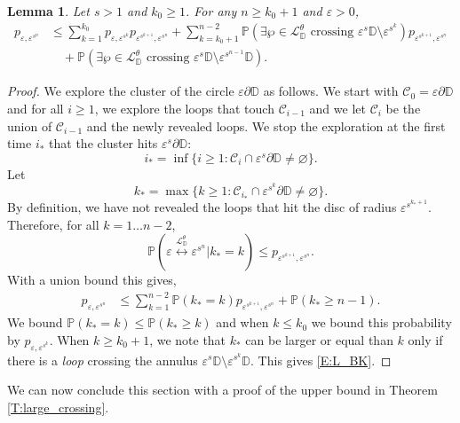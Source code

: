 \documentclass[11pt]{article}
\newtheorem{lemma}[theorem]{Lemma}
\theoremstyle{remark}
\newcommand{\D}{\mathbb{D}}
\newcommand{\Cc}{\mathcal{C}}
\newcommand{\Lc}{\mathcal{L}}
\newcommand{\Prob}[1]{\mathbb{P} \left( #1 \right) }
\newcommand{\eps}{\varepsilon}
\numberwithin{equation}{section}
\begin{document}
\begin{lemma}\label{L:BK_inequality}
Let $s>1$ and $k_0 \geq 1$. For any $n \geq k_0+1$ and $\eps >0$,
\begin{align}
\label{E:L_BK}
p_{\eps, \eps^{s^n}} & \leq \sum_{k=1}^{k_0} p_{\eps,\eps^{s^k}} p_{\eps^{s^{k+1}},\eps^{s^n}} + \sum_{k=k_0+1}^{n-2} \Prob{ \exists \wp \in \Lc_\D^\theta \text{~crossing~} \eps^s \D \setminus \eps^{s^k} } p_{\eps^{s^{k+1}}, \eps^{s^n}} \\
& \quad + \Prob{ \exists \wp \in \Lc_\D^\theta \text{~crossing~} \eps^s \D \setminus \eps^{s^{n-1}} \D }.
\nonumber
\end{align}
\end{lemma}


\begin{proof}
We explore the cluster of the circle $\eps \partial \D$ as follows. We start with $\Cc_0 = \eps \partial \D$ and for all $i \geq 1$, we explore the loops that touch $\Cc_{i-1}$ and we let $\Cc_i$ be the union of $\Cc_{i-1}$ and the newly revealed loops.
We stop the exploration at the first time $i_*$ that the cluster hits $\eps^{s} \partial \D$:
\[
i_* = \inf \{ i \geq 1: \Cc_i \cap \eps^{s} \partial \D \neq \varnothing \}.
\]
Let
\[
k_* = \max \{ k \geq 1: \Cc_{i_*} \cap \eps^{s^k} \partial \D \neq \varnothing \}.
\]
By definition, we have not revealed the loops that hit the disc of radius $\eps^{s^{k_*+1}}$. Therefore, for all $k = 1 \dots n-2$,
\[
\Prob{ \eps \overset{\Lc_\D^\theta}{\longleftrightarrow} \eps^{s^n} \vert k_* = k }
\leq p_{\eps^{s^{k+1}},\eps^{s^n}}.
\]
With a union bound this gives,
\begin{align*}
p_{\eps, \eps^{s^n}} & \leq 
\sum_{k=1}^{n-2} \Prob{k_* = k} p_{\eps^{s^{k+1}},\eps^{s^n}}
+ \Prob{k_* \geq n-1}.
\end{align*}
We bound $\Prob{ k_* = k} \leq \Prob{ k_* \geq k}$ and when $k \leq k_0$ we bound this probability by $p_{\eps, \eps^{s^k}}$. When $k \geq k_0 +1$, we note that $k_*$ can be larger or equal than $k$ only if there is a \emph{loop} crossing the annulus $\eps^s \D \setminus \eps^{s^k} \D$. This gives \eqref{E:L_BK}.
\end{proof}

We can now conclude this section with a proof of the upper bound in Theorem \ref{T:large_crossing}.
\end{document}
